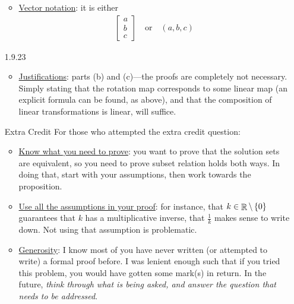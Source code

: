 \documentclass{amsart}
\theoremstyle{definition}
\theoremstyle{definition}
\DeclareMathOperator{\R}{\mathbb{R}}
\DeclareMathOperator{\1}{\mathbbm{1}}
\begin{document}
\begin{enumerate}[itemsep = 1.5mm]
\begin{itemize}
		
		\item \uline{Vector notation}: it is either
		\begin{align*}
			\begin{bmatrix}
			a \\ b \\ c
			\end{bmatrix} \quad \text{or} \quad (a,b,c)
		\end{align*}
		
	\end{itemize}
	
	
	
	\item[1.9.23] \begin{itemize}
		\item \uline{Justifications}: parts (b) and (c)---the proofs are completely not necessary. Simply stating that the rotation map corresponds to some linear map (an explicit formula can be found, as above), and that the composition of linear transformations is linear, will suffice.
	\end{itemize}
	
	
	\item[Extra Credit] For those who attempted the extra credit question:
	\begin{itemize}
		\item \uline{Know what you need to prove}: you want to prove that the solution sets are equivalent, so you need to prove subset relation holds both ways. In doing that, start with your assumptions, then work towards the proposition.
		
		\item \uline{Use all the assumptions in your proof}: for instance, that $k \in \R \setminus \set{0}$ guarantees that $k$ has a multiplicative inverse, that $\frac{1}{k}$ makes sense to write down. Not using that assumption is problematic.
		
		\item \uline{Generosity}: I know most of you have never written (or attempted to write) a formal proof before. I was lenient enough such that if you tried this problem, you would have gotten some mark(s) in return. In the future, \textit{think through what is being asked, and answer the question that needs to be addressed}.
	\end{itemize}

\end{enumerate}
\end{document}
